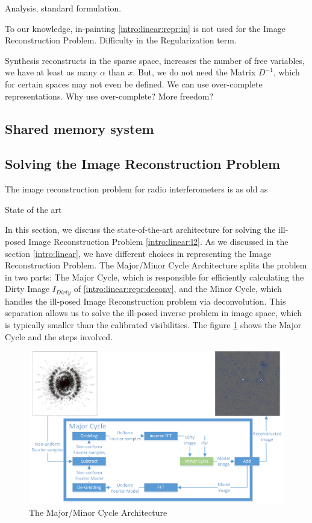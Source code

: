Analysis, standard formulation.

To our knowledge, in-painting \eqref{intro:linear:repr:in} is not used for the Image Reconstruction Problem. Difficulty in the Regularization term. 

Synthesis reconstructs in the sparse space, increases the number of free variables, we have at least as many $\alpha$ than $x$. But, we do not need the Matrix $D^{-1}$, which for certain spaces may not even be defined. We can use over-complete representations.
Why use over-complete? More freedom?


\subsection{Shared memory system}



\subsection{Solving the Image Reconstruction Problem}

The image reconstruction problem for radio interferometers is as old as 

State of the art

In this section, we discuss the state-of-the-art architecture for solving the ill-posed Image Reconstruction Problem \eqref{intro:linear:l2}.
As we discussed in the section \ref{intro:linear}, we have different choices in representing the Image Reconstruction Problem. The Major/Minor Cycle Architecture splits the problem in two parts: The Major Cycle, which is responsible for efficiently calculating the Dirty Image $I_{Dirty}$ of \eqref{intro:linear:repr:deconv}, and the Minor Cycle, which handles the ill-posed Image Reconstruction problem via deconvolution. 
This separation allows us to solve the ill-posed inverse problem in image space, which is typically smaller than the calibrated visibilities. The figure \ref{intro:major} shows the Major Cycle and the steps involved.

\begin{figure}[h]
	\centering
	\includegraphics[width=0.80\linewidth]{./chapters/02.hypo/Major-Minor3.png}
	\caption{The Major/Minor Cycle Architecture}
	\label{intro:major}
\end{figure}

